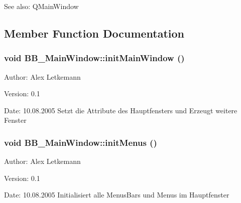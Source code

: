 \begin{Desc}
\item[See also:]QMain\-Window \end{Desc}


\subsection{Member Function Documentation}
\subsubsection{\setlength{\rightskip}{0pt plus 5cm}void BB\_\-Main\-Window::init\-Main\-Window ()}\label{classBB__MainWindow_a4}


\begin{Desc}
\item[Author:]Alex Letkemann \end{Desc}
\begin{Desc}
\item[Version:]0.1 \end{Desc}
\begin{Desc}
\item[Date:]10.08.2005 Setzt die Attribute des Hauptfensters und Erzeugt weitere Fenster \end{Desc}
\subsubsection{\setlength{\rightskip}{0pt plus 5cm}void BB\_\-Main\-Window::init\-Menus ()}\label{classBB__MainWindow_a3}


\begin{Desc}
\item[Author:]Alex Letkemann \end{Desc}
\begin{Desc}
\item[Version:]0.1 \end{Desc}
\begin{Desc}
\item[Date:]10.08.2005 Initialisiert alle Menus\-Bars und Menus im Hauptfenster \end{Desc}
